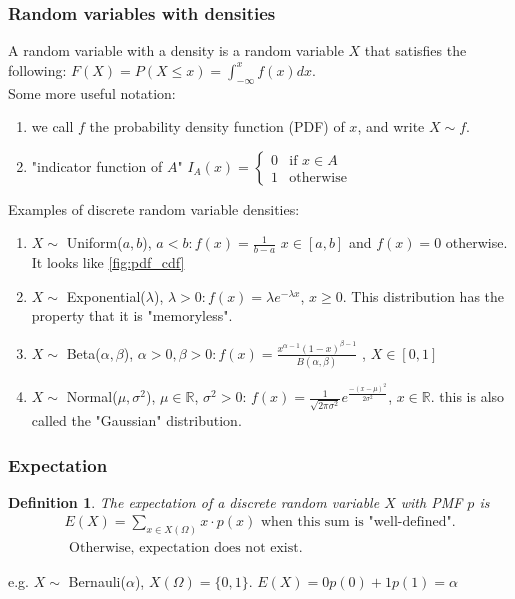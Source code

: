 \documentclass{article}
\newtheorem{definition}{Definition}
\newcommand{\R}{ \mathbb{R} }
\begin{document}
\subsubsection{Random variables with densities}
A random variable with a density is a random variable $X$ that satisfies the following: 
$F(X) = P(X \le x) = \int_{-\infty}^{x} f(x)dx$. \\
Some more useful notation: 
\begin{enumerate}
    \item we call $f$ the probability density function (PDF) of $x$, and write 
        $X \sim f$.
    \item "indicator function of $A$" $I_A(x) = \begin{cases} 0 & \text{if } x \in A \\ 1 & \text{otherwise} \end{cases}$
\end{enumerate}
Examples of discrete random variable densities: 
\begin{enumerate}
    \item $X \sim $ Uniform($a, b$),  $a < b : f(x) = \frac{1}{b-a}$ $x \in [a, b]$ and 
        $f(x) = 0$ otherwise. It looks like \ref{fig:pdf_cdf}
    \item $X \sim $ Exponential($\lambda$), $\lambda > 0 : f(x) = \lambda e^{-\lambda x}$, 
         $x \ge 0$. This distribution has the property that it is "memoryless".
    \item $X \sim $ Beta($\alpha, \beta$),  $\alpha > 0, \beta > 0 : f(x) = \frac{x^{\alpha-1}(1-x)^{\beta-1}}{B(\alpha, \beta)}$ , $X \in  [0,1]$
    \item $X \sim $ Normal($\mu, \sigma^2$), $\mu \in \R$,  $\sigma^2 > 0$: 
        $f(x) = \frac{1}{\sqrt{2\pi\sigma^2}}e^{\frac{-(x-\mu)^2}{2\sigma^2}}$, $x \in \R$.
        this is also called the "Gaussian" distribution.
\end{enumerate}

\subsubsection{Expectation}

\begin{definition}
    The expectation of a discrete random variable $X$ with PMF $p$ is 
    \begin{align*}
        E(X) = \sum_{x \in X(\Omega)} x \cdot p(x) \text{ when this sum is "well-defined".}\\
        \text{ Otherwise, expectation does not exist}
    .\end{align*}
\end{definition}
e.g. $X \sim $ Bernauli($\alpha$), $X(\Omega) = \{ 0, 1\}$. $E(X) = 0p(0) + 1p(1)=\alpha$
\end{document}
